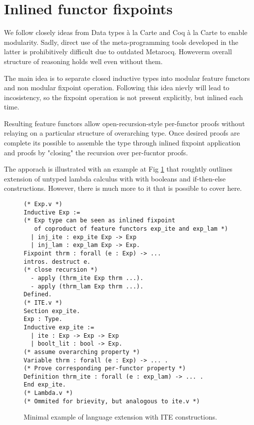 \documentclass[sigplan,nonacm]{acmart}
\begin{document}

\section{Inlined functor fixpoints }

We follow closely ideas from Data types à la Carte\cite{swierstra2008data} and  Coq à la Carte\cite{forster2020coq} to enable modularity. 
Sadly, direct use of the meta-programming tools developed in the latter is prohibitively difficult due to outdated Metarocq\cite{sozeau2020metacoq}. 
Howeverm overall structure of reasoning holds well even without them. 

The main idea is to separate closed inductive types into modular feature functors and non modular fixpoint operation. 
Following this idea nievly will lead to incosistency, so the fixpoint operation is not present explicitly, but inlined each time.

Resulting feature functors allow open-recursion-style per-functor proofs without relaying on a particular structure of overarching type.
Once desired proofs are complete its possible to assemble the type through inlined fixpoint application and proofs by "closing" the recursion over per-fucntor proofs.

The apporach is illustrated with an example at Fig \ref{fig:alacart_example} that roughtly outlines extension of untyped lambda calculus with with booleans and if-then-else constructions. 
However, there is much more to it that is possible to cover here.

\begin{figure}
\begin{lstlisting}[language=Coq]
(* Exp.v *)
Inductive Exp := 
(* Exp type can be seen as inlined fixpoint 
   of coproduct of feature functors exp_ite and exp_lam *)
  | inj_ite : exp_ite Exp -> Exp
  | inj_lam : exp_lam Exp -> Exp.
Fixpoint thrm : forall (e : Exp) -> ...
intros. destruct e.
(* close recursion *)
  - apply (thrm_ite Exp thrm ...).
  - apply (thrm_lam Exp thrm ...).
Defined.
(* ITE.v *)
Section exp_ite.
Exp : Type.
Inductive exp_ite := 
  | ite : Exp -> Exp -> Exp
  | boolt_lit : bool -> Exp.
(* assume overarching property *)
Variable thrm : forall (e : Exp) -> ... .
(* Prove corresponding per-functor property *)
Definition thrm_ite : forall (e : exp_lam) -> ... .
End exp_ite.
(* Lambda.v *)
(* Ommited for brievity, but analogous to ite.v *)
\end{lstlisting}
  \caption{Minimal example of language extension with ITE constructions.}
  \label{fig:alacart_example}
\end{figure}
\end{document}
